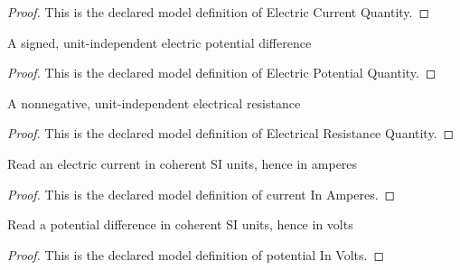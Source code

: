 \begin{proof}
  This is the declared model definition of Electric Current Quantity.
\end{proof}
\begin{definition}
  \label{def:physics:phyx-mini-0629:phyxminiproblems-problemphyxmini0629-electricpotentialquantity}
  A signed, unit-independent electric potential difference
\end{definition}
\begin{proof}
  This is the declared model definition of Electric Potential Quantity.
\end{proof}
\begin{definition}
  \label{def:physics:phyx-mini-0629:phyxminiproblems-problemphyxmini0629-electricalresistancequantity}
  A nonnegative, unit-independent electrical resistance
\end{definition}
\begin{proof}
  This is the declared model definition of Electrical Resistance Quantity.
\end{proof}
\begin{definition}
  \label{def:physics:phyx-mini-0629:phyxminiproblems-problemphyxmini0629-currentinamperes}
  Read an electric current in coherent SI units, hence in amperes
\end{definition}
\begin{proof}
  This is the declared model definition of current In Amperes.
\end{proof}
\begin{definition}
  \label{def:physics:phyx-mini-0629:phyxminiproblems-problemphyxmini0629-potentialinvolts}
  Read a potential difference in coherent SI units, hence in volts
\end{definition}
\begin{proof}
  This is the declared model definition of potential In Volts.
\end{proof}
